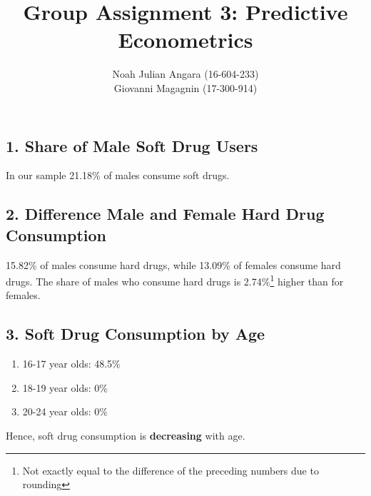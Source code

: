 \documentclass[a4paper,11pt]{article}
\begin{document}
\title{\textbf{Group Assignment 3: Predictive Econometrics}}
\author{Noah Julian Angara (16-604-233)\\
Giovanni Magagnin (17-300-914)}
\maketitle

\subsection*{1. Share of Male Soft Drug Users}
In our sample 21.18\% of males consume soft drugs.
\subsection*{2. Difference Male and Female Hard Drug Consumption}
15.82\% of males consume hard drugs, while 13.09\% of females consume hard drugs. The share of males who consume hard drugs is 2.74\%\footnote{Not exactly equal to the difference of the preceding numbers due to rounding} higher than for females.

\subsection*{3. Soft Drug Consumption by Age}
\begin{enumerate}
  \item 16-17 year olds: 48.5\%
  \item 18-19 year olds: 0\%
  \item 20-24 year olds: 0\%
\end{enumerate}

Hence, soft drug consumption is \textbf{decreasing} with age.
\end{document}

